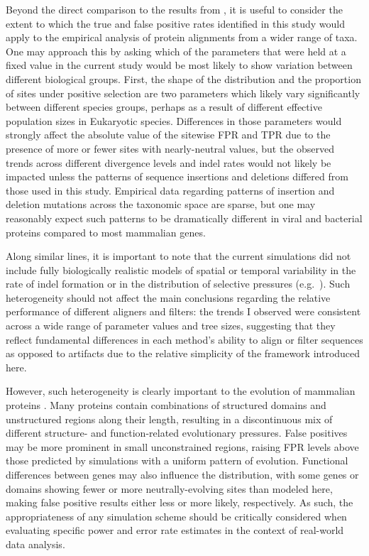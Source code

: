 Beyond the direct comparison to the results from
\citet{Privman2011Improving}, it is useful to consider the extent to
which the true and false positive rates identified in this study would
apply to the empirical analysis of protein alignments from a wider
range of taxa. One may approach this by asking which of the parameters
that were held at a fixed value in the current study would be most
likely to show variation between different biological groups. First,
the shape of the \omg distribution and the proportion of sites under
positive selection are two parameters which likely vary significantly
between different species groups, perhaps as a result of different
effective population sizes in Eukaryotic species. Differences in those
parameters would strongly affect the absolute value of the sitewise
FPR and TPR due to the presence of more or fewer sites with
nearly-neutral \omg values, but the observed trends across different
divergence levels and indel rates would not likely be impacted unless
the patterns of sequence insertions and deletions differed from those
used in this study. Empirical data regarding patterns of insertion and
deletion mutations across the taxonomic space are sparse, but one may
reasonably expect such patterns to be dramatically different in viral
and bacterial proteins compared to most mammalian genes.


Along similar lines, it is important to note that the current
simulations did not include fully biologically realistic models of
spatial or temporal variability in the rate of indel formation or in
the distribution of selective pressures (e.g.\,
\citet{Whelan2008}). Such heterogeneity should not affect the main
conclusions regarding the relative performance of different aligners
and filters: the trends I observed were consistent across a wide range
of parameter values and tree sizes, suggesting that they reflect
fundamental differences in each method's ability to align or filter
sequences as opposed to artifacts due to the relative simplicity of
the framework introduced here.

However, such heterogeneity is clearly important to the evolution of
mammalian proteins \citep{Fay2003}. Many proteins contain combinations
of structured domains and unstructured regions along their length,
resulting in a discontinuous mix of different structure- and
function-related evolutionary pressures. False positives may be more
prominent in small unconstrained regions, raising FPR levels above
those predicted by simulations with a uniform pattern of
evolution. Functional differences between genes may also influence the
\omg distribution, with some genes or domains showing fewer or more
neutrally-evolving sites than modeled here, making false positive
results either less or more likely, respectively. As such, the
appropriateness of any simulation scheme should be critically
considered when evaluating specific power and error rate estimates in
the context of real-world data analysis.

